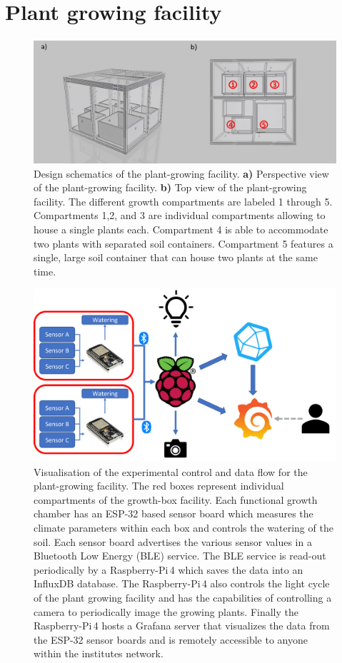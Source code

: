 \documentclass[reprint,superscriptaddress,aps,amsmath,amssymb]{revtex4-1}
\begin{document}
\section{Plant growing facility}
\begin{figure}
    \centering
    \includegraphics[width=1\linewidth]{growbox.jpg}
    \caption{Design schematics of the plant-growing facility. \textbf{a)} Perspective view of the plant-growing facility. \textbf{b)} Top view of the plant-growing facility. The different growth compartments are labeled 1 through 5. Compartments 1,2, and 3 are individual compartments allowing to house a single plants each. Compartment 4 is able to accommodate two plants with separated soil containers. Compartment 5 features a single, large soil container that can house two plants at the same time.}
    \label{fig: Growth Box}
\end{figure}
\begin{figure}
    \centering
    \includegraphics[width = \linewidth]{Data overview.png}
    \caption{Visualisation of the experimental control and data flow for the plant-growing facility. The red boxes represent individual compartments of the growth-box facility. Each functional growth chamber has an ESP-32 based sensor board which measures the climate parameters within each box and controls the watering of the soil. Each sensor board advertises the various sensor values in a Bluetooth Low Energy (BLE) service. The BLE service is read-out periodically by a Raspberry-Pi\,4 which saves the data into an InfluxDB database. The Raspberry-Pi\,4 also controls the light cycle of the plant growing facility and has the capabilities of controlling a camera to periodically image the growing plants. Finally the Raspberry-Pi\,4 hosts a Grafana server that visualizes the data from the ESP-32 sensor boards and is remotely accessible to anyone within the institutes network.}
    \label{fig:Data overview}
\end{figure}
\end{document}
